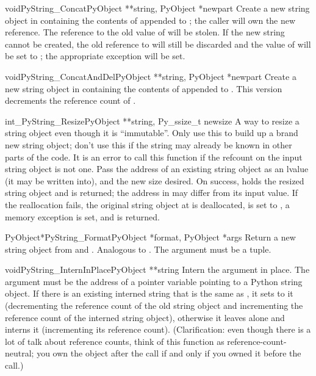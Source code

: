 \begin{cfuncdesc}{void}{PyString_Concat}{PyObject **string,
                                         PyObject *newpart}
  Create a new string object in  containing the contents
  of  appended to ; the caller will own the
  new reference.  The reference to the old value of  will
  be stolen.  If the new string cannot be created, the old reference
  to  will still be discarded and the value of
   will be set to \NULL{}; the appropriate exception will
  be set.
\end{cfuncdesc}

\begin{cfuncdesc}{void}{PyString_ConcatAndDel}{PyObject **string,
                                               PyObject *newpart}
  Create a new string object in  containing the contents
  of  appended to .  This version decrements
  the reference count of .
\end{cfuncdesc}

\begin{cfuncdesc}{int}{_PyString_Resize}{PyObject **string, Py_ssize_t newsize}
  A way to resize a string object even though it is ``immutable''.
  Only use this to build up a brand new string object; don't use this
  if the string may already be known in other parts of the code.  It
  is an error to call this function if the refcount on the input string
  object is not one.
  Pass the address of an existing string object as an lvalue (it may
  be written into), and the new size desired.  On success, 
  holds the resized string object and  is returned; the address in
   may differ from its input value.  If the
  reallocation fails, the original string object at  is
  deallocated,  is set to \NULL{}, a memory exception is set,
  and  is returned.
\end{cfuncdesc}

\begin{cfuncdesc}{PyObject*}{PyString_Format}{PyObject *format,
                                              PyObject *args}
  Return a new string object from  and .
  Analogous to .  The 
  argument must be a tuple.
\end{cfuncdesc}

\begin{cfuncdesc}{void}{PyString_InternInPlace}{PyObject **string}
  Intern the argument  in place.  The argument must be
  the address of a pointer variable pointing to a Python string
  object.  If there is an existing interned string that is the same as
  , it sets  to it (decrementing the
  reference count of the old string object and incrementing the
  reference count of the interned string object), otherwise it leaves
   alone and interns it (incrementing its reference
  count).  (Clarification: even though there is a lot of talk about
  reference counts, think of this function as reference-count-neutral;
  you own the object after the call if and only if you owned it before
  the call.)
\end{cfuncdesc}

